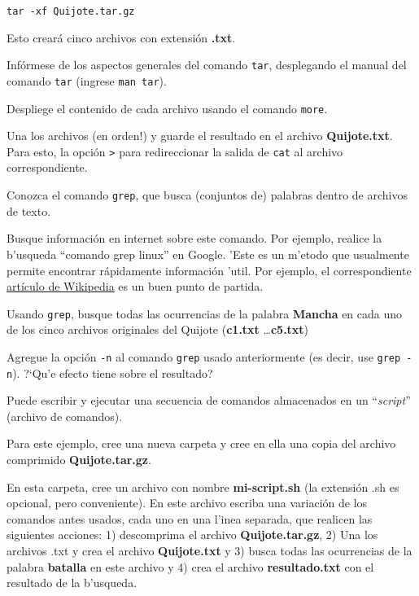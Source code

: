\documentclass[11pt]{exam}
\begin{document}
\begin{questions}
\begin{parts}
\begin{verbatim}
tar -xf Quijote.tar.gz
\end{verbatim}

Esto creará cinco archivos con extensión \textbf{.txt}. 
\item Infórmese de los aspectos generales del comando \texttt{tar}, desplegando el manual del comando \texttt{tar} (ingrese \texttt{man tar}).
\item Despliege el contenido de cada archivo usando el comando \texttt{more}.
\item Una los archivos (en orden!) y guarde el resultado en el archivo \textbf{Quijote.txt}. Para esto, la opción \texttt{>} para redireccionar la salida de \texttt{cat} al archivo correspondiente.
\end{parts}

\item Conozca el comando \texttt{grep}, que busca (conjuntos de) palabras dentro de archivos de texto. 
\begin{parts}
\item Busque información en internet sobre este comando. Por ejemplo, realice la b'usqueda ``comando grep linux'' en Google. 'Este es un m'etodo que usualmente permite encontrar rápidamente información 'util. Por ejemplo, el correspondiente \href{https://es.wikipedia.org/wiki/Grep}{artículo de Wikipedia} es un buen punto de partida.

\item Usando \texttt{grep}, busque todas las ocurrencias de la palabra \textbf{Mancha} en cada uno de los cinco archivos originales del Quijote (\textbf{c1.txt} \dots \textbf{c5.txt})

\item Agregue la opción \texttt{-n} al comando \texttt{grep} usado anteriormente (es decir, use \texttt{grep -n}). ?`Qu'e efecto tiene sobre el resultado?
\end{parts}

\item Puede escribir y ejecutar una secuencia de comandos almacenados en un ``\textit{script}'' (archivo de comandos).
\begin{parts}
\item Para este ejemplo, cree una nueva carpeta y cree en ella una copia del archivo comprimido \textbf{Quijote.tar.gz}.

\item En esta carpeta, cree un archivo con nombre \textbf{mi-script.sh} (la extensión .sh es opcional, pero conveniente). En este archivo escriba una variación de los  comandos antes usados, cada uno en una l'inea separada, que realicen las siguientes acciones: 1) descomprima el archivo \textbf{Quijote.tar.gz}, 2) Una los archivos .txt y crea el archivo \textbf{Quijote.txt} y 3) busca todas las ocurrencias de la palabra \textbf{batalla} en este archivo y 4) crea el archivo \textbf{resultado.txt} con el resultado de la b'usqueda.


\end{parts}
\end{questions}
\end{document}
